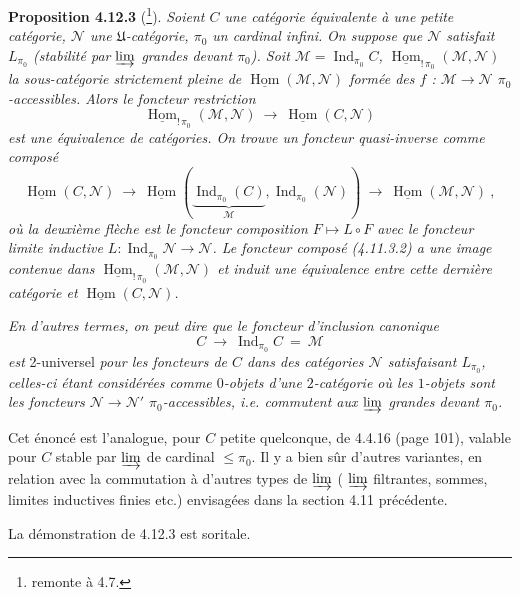 \documentclass[11pt]{article}
\newcommand{\msp}[1]{\marginpar{\footnotesize [#1]}}
\newcommand{\Hom}{\underline{\operatorname{Hom}}}
\newcommand{\Ind}{\operatorname{Ind}}
\begin{document}
\textbf{Proposition 4.12.3} (\footnote{remonte à 4.7.}). \textit{Soient $C$ une catégorie équivalente à une petite catégorie, $\mathcal{N}$ une $\mathfrak{U}$-catégorie, $\pi_0$ un cardinal infini.} \msp{page 276} \textit{On suppose que $\mathcal{N}$ satisfait $L_{\pi_0}$ (stabilité par $\varinjlim$ grandes devant $\pi_0$). Soit $\mathcal{M} = \Ind_{\pi_0} C$, $\Hom_{!\,\pi_0}(\mathcal{M},\mathcal{N})$ la sous-catégorie strictement pleine de $\Hom(\mathcal{M},\mathcal{N})$ formée des $f$ : $\mathcal{M} \longrightarrow \mathcal{N}$ $\pi_0$-accessibles. Alors le foncteur restriction}
\[
\Hom_{!\,\pi_0}(\mathcal{M},\mathcal{N}) \ \longrightarrow \ \Hom(C,\mathcal{N}) \tag*{(4.12.3.1)}
\]
\textit{est une équivalence de catégories. On trouve un foncteur quasi-inverse comme composé}
\[
\Hom(C,\mathcal{N}) \ \longrightarrow \ \Hom(\underbrace{\Ind_{\pi_0}(C)}_{\mathcal{M}},\Ind_{\pi_0}(\mathcal{N})) \ \longrightarrow \ \Hom(\mathcal{M},\mathcal{N}) \ , \tag*{(4.12.3.2)}
\]
\textit{où la deuxième flèche est le foncteur composition $F \longmapsto L \circ F$ avec le foncteur limite inductive $L : \Ind_{\pi_0}\mathcal{N} \longrightarrow \mathcal{N}$. Le foncteur composé (4.11.3.2) a une image contenue dans $\Hom_{!\,\pi_0}(\mathcal{M},\mathcal{N})$ et induit une équivalence entre cette dernière catégorie et $\Hom(C,\mathcal{N})$.} %

\msp{page 277}

\textit{En d'autres termes, on peut dire que le foncteur d'inclusion canonique}
\[
C \ \longrightarrow \ \Ind_{\pi_0} C \ = \ \mathcal{M}
\]
\textit{est} 2-universel \textit{pour les foncteurs de $C$ dans des catégories $\mathcal{N}$ satisfaisant $L_{\pi_0}$, celles-ci étant considérées comme $0$-objets d'une $2$-catégorie où les $1$-objets sont les foncteurs $\mathcal{N} \longrightarrow \mathcal{N}'$ $\pi_0$-accessibles, i.e. commutent aux $\varinjlim$ grandes devant $\pi_0$.}

Cet énoncé est l'analogue, pour $C$ petite quelconque, de 4.4.16 (page 101), valable pour $C$ stable par $\varinjlim$ de cardinal $\leqslant \pi_0$. Il y a bien sûr d'autres variantes, en relation avec la commutation à d'autres types de $\varinjlim$ ( $\varinjlim$ filtrantes, sommes, limites inductives finies etc.) envisagées dans la section 4.11 précédente.

La démonstration de 4.12.3 est soritale.
\end{document}
